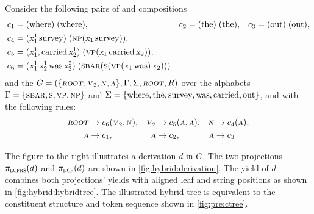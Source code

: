 \documentclass[../../document.tex]{subfiles}
\begin{document}
    \begin{example}\label{ex:hg:derivation}
        Consider the following pairs of  and  compositions
        \begin{align*}
            c_1 &= (\tn{where})\;(\tn{where}),
            &c_2 &= (\tn{the})\;(\tn{the}),
            &c_3 &= (\tn{out})\;(\tn{out}), \\
%
            c_4 &= (\x_1^1\, \tn{survey})\;(\cn{np} (\x_1 \, \tn{survey})), \\
            c_5 &= (\x_1^1, \tn{carried}\,\x_2^1)\;(\cn{vp}(\x_1 \, \tn{carried}\,\x_2)), \\
            c_6 &= (\x_1^1\,\x_2^1\,\tn{was}\,\x_2^2)\;(\cn{sbar} (\cn{s} (\cn{vp} (\x_1\, \tn{was})\,\x_2)))
        \end{align*}
        and the  \(G= (\{\textsc{\textsl{root}}, \textsc{\textsl{v}}_2, \textsc{\textsl{n}}, \textsc{\textsl{a}}\}, \Gamma, \Sigma, \textsc{\textsl{root}}, R)\) over the alphabets \(\Gamma = \{\textsc{sbar}, \textsc{s}, \textsc{vp}, \textsc{np}\}\) and \(\Sigma = \{\text{where}, \text{the}, \text{survey}, \text{was}, \text{carried}, \text{out}\}\), and with the following rules:
        \begin{align*}
            \textsc{\textsl{root}} &\to c_6 (\textsc{\textsl{v}}_2, \textsc{\textsl{n}}), & \textsc{\textsl{v}}_2 &\to c_5 (\textsc{\textsl{a}}, \textsc{\textsl{a}}), & \textsc{\textsl{n}} &\to c_4 (\textsc{\textsl{a}}), \\
            \textsc{\textsl{a}} &\to c_1, & \textsc{\textsl{a}} &\to c_2, & \textsc{\textsl{a}} &\to c_3
        \end{align*}

        \noindent
        \begin{minipage}[b]{.63\linewidth}
            The figure to the right illustrates a derivation \(d\) in \(G\).
            The two projections \(\pi_{\textsc{lcfrs}}(d)\) and \(\pi_{\textsc{dcp}}(d)\) are shown in \cref{fig:hybrid:derivation}.
            The yield of \(d\) combines both projections' yields with aligned leaf and string positions as shown in \cref{fig:hybrid:hybridtree}.
            The illustrated hybrid tree is equivalent to the constituent structure and token sequence shown in \cref{fig:pre:ctree}.
        \end{minipage}
        \hfill
    \end{example}
\end{document}
